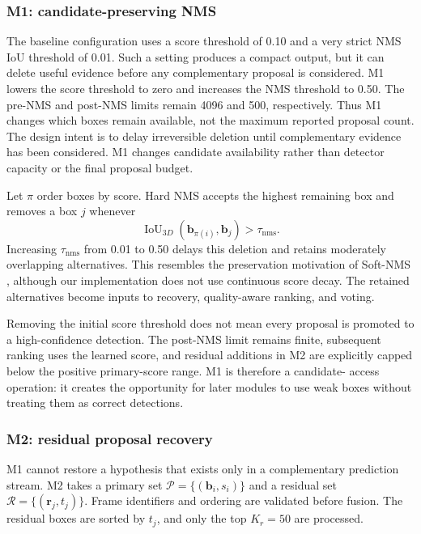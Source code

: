 \documentclass[sensors,article,submit,pdftex,moreauthors]{Definitions/mdpi}
\begin{document}
\subsubsection{M1: candidate-preserving NMS}

The baseline configuration uses a score threshold of 0.10 and a very strict
NMS IoU threshold of 0.01. Such a setting produces a compact output, but it
can delete useful evidence before any complementary proposal is considered.
M1 lowers the score threshold to zero and increases the NMS threshold to 0.50.
The pre-NMS and post-NMS limits remain 4096 and 500, respectively. Thus M1
changes which boxes remain available, not the maximum reported proposal count.
The design intent is to delay irreversible deletion until complementary
evidence has been considered. M1 changes candidate availability rather than
detector capacity or the final proposal budget.

Let $\pi$ order boxes by score. Hard NMS accepts the highest remaining box and
removes a box $j$ whenever
\begin{equation}
\operatorname{IoU}_{3D}(\mathbf{b}_{\pi(i)},\mathbf{b}_j)>\tau_{\mathrm{nms}}.
\end{equation}
Increasing $\tau_{\mathrm{nms}}$ from 0.01 to 0.50 delays this deletion and
retains moderately overlapping alternatives. This resembles the preservation
motivation of Soft-NMS \cite{bodla2017softnms}, although our implementation
does not use continuous score decay. The retained alternatives become inputs
to recovery, quality-aware ranking, and voting.

Removing the initial score threshold does not mean every proposal is promoted
to a high-confidence detection. The post-NMS limit remains finite, subsequent
ranking uses the learned score, and residual additions in M2 are explicitly
capped below the positive primary-score range. M1 is therefore a candidate-
access operation: it creates the opportunity for later modules to use weak
boxes without treating them as correct detections.

\subsubsection{M2: residual proposal recovery}

M1 cannot restore a hypothesis that exists only in a complementary prediction
stream. M2 takes a primary set
$\mathcal{P}=\{(\mathbf{b}_i,s_i)\}$ and a residual set
$\mathcal{R}=\{(\mathbf{r}_j,t_j)\}$. Frame identifiers and ordering are
validated before fusion. The residual boxes are sorted by $t_j$, and only the
top $K_r=50$ are processed.
\end{document}
